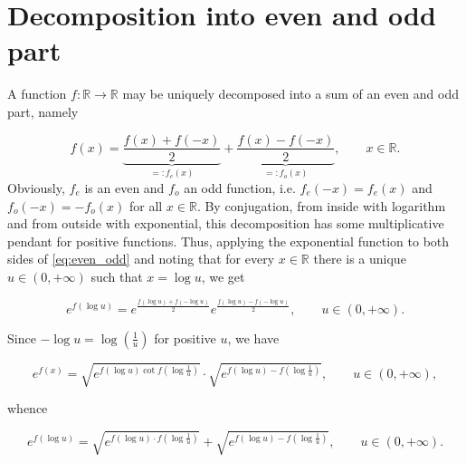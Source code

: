 \documentclass{amsart}
\theoremstyle{plain}
\numberwithin{equation}{section}
\newcommand{\R}{{\mathbb{R}}}
\begin{document}

\section*{Decomposition into even and odd part}
A function $f: \R \to \R$ may be uniquely decomposed into  a sum of
an even and odd part, namely

\begin{equation}
f(x)=
\underbrace{\frac{f(x)+f(-x)}{2}}_{=:f_e(x)}+
\underbrace{\frac{f(x)-f(-x)}{2}}_{=:f_o(x)}, \qquad x \in \R.
\label{eq:even_odd}
\end{equation}
Obviously, $f_e$ is an even and $f_o$ an odd function, 
i.e. $f_e(-x)=f_e(x)$ and $f_o(-x)=-f_o(x)$ for all $x\in \R$.
By conjugation,
 from inside with logarithm and from outside with exponential, 
 this decomposition has some multiplicative pendant for positive functions.
Thus,  applying the exponential function to both sides of \eqref{eq:even_odd}
and noting that for every $x \in \R$ there is a unique $u \in (0, + \infty)$ such that $x=\log{u}$, we get
 
 \begin{equation}
e^{f(\log{u})}=
e^{\frac{f(\log{u})+f(-\log{u})}{2}}
e^{\frac{f(\log{u})-f(-\log{u})}{2}}, \qquad u \in (0, + \infty).
\end{equation}
 
 Since $-\log{u}=\log{\left(\frac{1}{u}\right)}$ for positive $u$, we have
 
   \begin{equation*}
e^{f(x)}=
\sqrt{e^{f(\log{u})\cot f(\log{\frac{1}{u}})}} \cdot
\sqrt{e^{f(\log{u})-f(\log{\frac{1}{u}})}},
\qquad u \in (0, + \infty),
\end{equation*}

whence

\begin{equation*}
e^{f(\log{u})}=
\sqrt{e^{f(\log{u}) \cdot f(\log{\frac{1}{u}})}}+
\sqrt{e^{f(\log{u})-f(\log{\frac{1}{u}})}},
\qquad u \in (0, + \infty).
\end{equation*}
\end{document}
